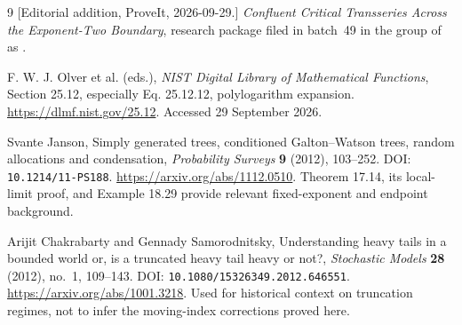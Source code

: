 \documentclass[11pt,a4paper]{article}
\numberwithin{equation}{section}
\theoremstyle{definition}
\theoremstyle{remark}
\begin{document}
\begin{thebibliography}{9}
[Editorial addition, ProveIt, 2026-09-29.]
\emph{Confluent Critical Transseries Across the Exponent-Two Boundary},
research package filed in batch~49 in the group of \cite{repo-index} as
.

F. W. J. Olver et al. (eds.), \emph{NIST Digital Library of Mathematical
Functions}, Section 25.12, especially Eq. 25.12.12, polylogarithm expansion.
\url{https://dlmf.nist.gov/25.12}. Accessed 29 September 2026.

Svante Janson, Simply generated trees, conditioned Galton--Watson trees,
random allocations and condensation, \emph{Probability Surveys} \textbf{9}
(2012), 103--252. DOI: \texttt{10.1214/11-PS188}.
\url{https://arxiv.org/abs/1112.0510}. Theorem 17.14, its local-limit proof,
and Example 18.29 provide relevant fixed-exponent and endpoint background.

Arijit Chakrabarty and Gennady Samorodnitsky, Understanding heavy tails in a
bounded world or, is a truncated heavy tail heavy or not?,
\emph{Stochastic Models} \textbf{28} (2012), no.~1, 109--143.
DOI: \texttt{10.1080/15326349.2012.646551}.
\url{https://arxiv.org/abs/1001.3218}. Used for historical context on truncation
regimes, not to infer the moving-index corrections proved here.
\end{thebibliography}
\end{document}
